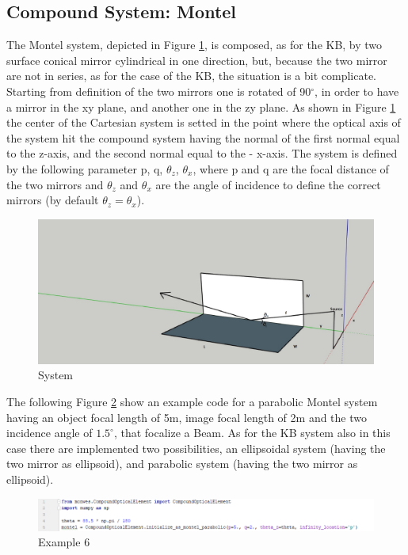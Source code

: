 \subsection{Compound System: Montel }
The Montel system, depicted in Figure \ref{fig: MontelSystem}, is composed, as for the KB, by two surface conical mirror cylindrical in one direction, but, because the two mirror are not in series, as for the case of the KB, the situation is a bit complicate. Starting from definition of the two mirrors one is rotated of 90$^\circ $, in order to have a mirror in the xy plane, and another one in the zy plane. As shown in Figure \ref{fig: MontelSystem} the center of the Cartesian system is setted in the point where the  optical axis of the system hit the compound system having the normal of the first normal equal to the z-axis, and the second normal equal to the - x-axis. The system is defined by the following parameter p, q, $\theta_z $, $\theta_x $, where p and q are the focal distance of the two mirrors and $\theta_z $ and $\theta_x $ are the angle of incidence to define the correct mirrors  (by default $\theta_z = \theta_x $).
\begin{figure}[H]
%
\centering
%
\includegraphics[width=1.\textwidth]{Immagini/Chapter3/MontelSystem2}
%
\caption{System}
%
\label{fig: MontelSystem}
%
\end{figure}
The following Figure \ref{fig: CodeMontel} show an example code for a parabolic Montel system having an object focal length of 5m, image focal length of 2m and the two incidence angle of $1.5^{\circ} $, that focalize a Beam. As for the KB system also in this case there are implemented two possibilities, an ellipsoidal system (having the two mirror as ellipsoid), and parabolic system (having the two mirror as ellipsoid). 
\begin{figure}[H]
%
\centering
%
\includegraphics[width=1.\textwidth]{Immagini/Chapter3/CodeMontel}
%
\caption{Example 6}
%
\label{fig: CodeMontel}
%
\end{figure}
%
